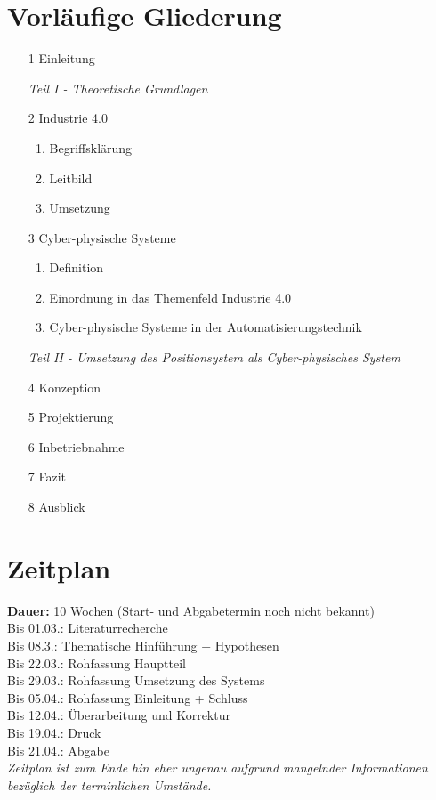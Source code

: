 \documentclass[12pt, a4paper, twoside]{article} %
\begin{document}
\section{Vorläufige Gliederung}
\begin{itemize}
	\item[1] Einleitung
	\item[] \textit{Teil I - Theoretische Grundlagen}
	\item[2] Industrie 4.0
	\begin{enumerate}[label*=\arabic*.]
		\item Begriffsklärung
		\item Leitbild
		\item Umsetzung 
	\end{enumerate}
	\item[3] Cyber-physische Systeme
	\begin{enumerate}[label*=\arabic*.]
		\item Definition
		\item Einordnung in das Themenfeld Industrie 4.0
		\item Cyber-physische Systeme in der Automatisierungstechnik
	\end{enumerate}
	\item[] \textit{Teil II - Umsetzung des Positionsystem als Cyber-physisches System}
	\item[4] Konzeption
	\item[5] Projektierung
	\item[6] Inbetriebnahme
	\item[7] Fazit
	\item[8] Ausblick
\end{itemize}

\section{Zeitplan}
\textbf{Dauer:} 10 Wochen (Start- und Abgabetermin noch nicht bekannt)\\
Bis 01.03.: Literaturrecherche\\
Bis 08.3.: Thematische Hinführung + Hypothesen\\
Bis 22.03.: Rohfassung Hauptteil\\
Bis 29.03.: Rohfassung Umsetzung des Systems\\
Bis 05.04.: Rohfassung Einleitung + Schluss\\
Bis 12.04.: Überarbeitung und Korrektur\\
Bis 19.04.: Druck \\
Bis 21.04.: Abgabe\\
\textit{Zeitplan ist zum Ende hin eher ungenau aufgrund mangelnder Informationen bezüglich der terminlichen Umstände.}
\end{document}
